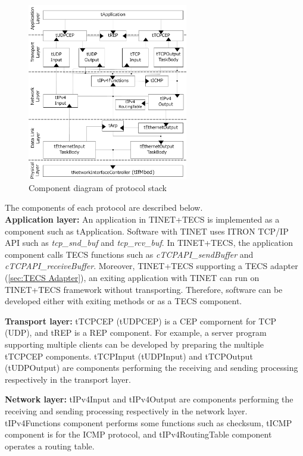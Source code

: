 \documentclass[conference]{IEEEtran/IEEEtran}
\begin{document}
\begin{figure}[t]
    \centering
    \includegraphics[width=7.0cm,clip]{figure/ComponentProtocolStack.pdf}
    \caption{Component diagram of protocol stack}
    \label{fig:ComponentProtocolStack}
\end{figure}

The components of each protocol are described below.\\

{\bf Application layer:}
An application in TINET+TECS is implemented as a component such as tApplication.
Software with TINET uses ITRON TCP/IP API such as {\it tcp\_snd\_buf} and {\it tcp\_rcv\_buf}.
In TINET+TECS, the application component calls TECS functions such as {\it cTCPAPI\_sendBuffer} and {\it cTCPAPI\_receiveBuffer}.
Moreover, TINET+TECS supporting a TECS adapter (\ref{sec:TECS Adapter}), an exiting application with TINET can run on TINET+TECS framework without transporting.
Therefore, software can be developed either with exiting methods or as a TECS component.

{\bf Transport layer:}
tTCPCEP (tUDPCEP) is a CEP compornent for TCP (UDP), and tREP is a REP component.
For example, a server program supporting multiple clients can be developed by preparing the multiple tTCPCEP components.
tTCPInput (tUDPInput) and tTCPOutput (tUDPOutput) are components performing the receiving and sending processing respectively in the transport layer.

{\bf Network layer:}
tIPv4Input and tIPv4Output are components performing the receiving and sending processing respectively in the network layer.
tIPv4Functions component performs some functions such as checksum, tICMP component is for the ICMP protocol, and tIPv4RoutingTable component operates a routing table.
\end{document}
